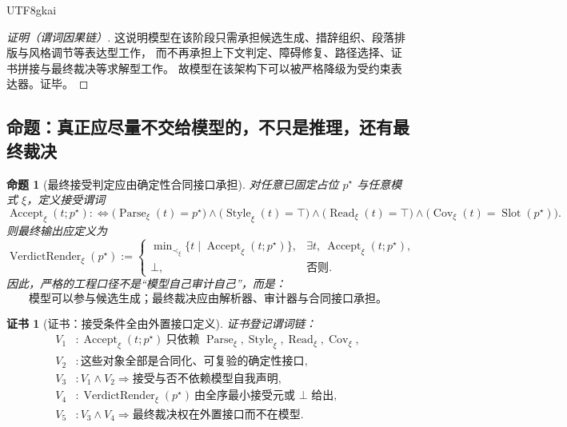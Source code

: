 \documentclass[12pt]{article}
\newtheorem{proposition}{命题}[section]
\newtheorem{Certificate}{证书}[section]
\newcommand{\Parse}{\operatorname{Parse}}
\newcommand{\Style}{\operatorname{Style}}
\begin{document}
\begin{CJK*}{UTF8}{gkai}
\begin{proof}[证明（谓词因果链）]
这说明模型在该阶段只需承担候选生成、措辞组织、段落排版与风格调节等表达型工作，
而不再承担上下文判定、障碍修复、路径选择、证书拼接与最终裁决等求解型工作。
故模型在该架构下可以被严格降级为受约束表达器。证毕。
\end{proof}

\subsection{命题：真正应尽量不交给模型的，不只是推理，还有最终裁决}
\label{subsec:tex37-ch5-prop-verdict}

\begin{proposition}[最终接受判定应由确定性合同接口承担]
\label{prop:tex37-ch5-verdict}
对任意已固定占位 $p^\star$ 与任意模式 $\xi$，定义接受谓词
\[
  \operatorname{Accept}_\xi(t;p^\star)
  :\Longleftrightarrow
  \bigl(
    \Parse_\xi(t)=p^\star
  \bigr)
  \wedge
  \bigl(
    \Style_\xi(t)=\top
  \bigr)
  \wedge
  \bigl(
    \operatorname{Read}_\xi(t)=\top
  \bigr)
  \wedge
  \bigl(
    \operatorname{Cov}_\xi(t)=\operatorname{Slot}(p^\star)
  \bigr).
\]
则最终输出应定义为
\[
  \operatorname{VerdictRender}_\xi(p^\star)
  :=
  \begin{cases}
    \min\nolimits_{\prec_\xi}
    \{t\mid \operatorname{Accept}_\xi(t;p^\star)\}, & \exists t,\ \operatorname{Accept}_\xi(t;p^\star),\\
    \bot, & \text{否则}.
  \end{cases}
\]
因此，严格的工程口径不是“模型自己审计自己”，而是：
\[
  \boxed{
    \text{模型可以参与候选生成；最终裁决应由解析器、审计器与合同接口承担。}
  }
\]
\end{proposition}

\begin{Certificate}[证书：接受条件全由外置接口定义]
\label{cert:tex37-ch5-verdict}
证书登记谓词链：
\[
\begin{aligned}
  V_1 &: \operatorname{Accept}_\xi(t;p^\star)\ \text{只依赖 }\Parse_\xi,\Style_\xi,\operatorname{Read}_\xi,
    \operatorname{Cov}_\xi,\\
  V_2 &: \text{这些对象全部是合同化、可复验的确定性接口},\\
  V_3 &: V_1\wedge V_2\Rightarrow \text{接受与否不依赖模型自我声明},\\
  V_4 &: \operatorname{VerdictRender}_\xi(p^\star)\ \text{由全序最小接受元或 }\bot\text{ 给出},\\
  V_5 &: V_3\wedge V_4\Rightarrow \text{最终裁决权在外置接口而不在模型}.
\end{aligned}
\]
\end{Certificate}


\end{CJK*}
\end{document}
